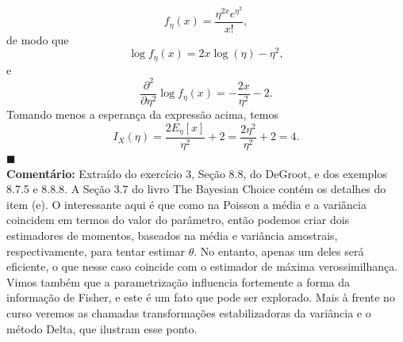 {\begin{equation*}
    f_\eta(x) = \frac{\eta^{2x}e^{\eta^2}}{x!},
\end{equation*}
de modo que
\begin{equation*}
   \log f_\eta(x) = 2x \log(\eta) -\eta^2,
\end{equation*}
e 
\begin{equation*}
   \frac{\partial^2}{\partial\eta^2}\log f_\eta(x) = -\frac{2x}{\eta^2}-2.
\end{equation*}
Tomando menos a esperança da expressão acima, temos
\begin{equation*}
    I_X(\eta) = \frac{2E_\eta[x]}{\eta^2} + 2 = \frac{2\eta^2}{\eta^2} + 2 = 4.
\end{equation*}
$\blacksquare$\\
\textbf{Comentário:}
 Extraído do exercício 3, Seção 8.8, do DeGroot, e dos exemplos 8.7.5 e 8.8.8. A Seção 3.7 do livro The Bayesian Choice contém os detalhes do item (e). 
 O interessante aqui é que como na Poisson a média e a variância coincidem em termos do valor do parâmetro, então podemos criar dois estimadores de momentos, baseados na média e variância amostrais, respectivamente, para tentar estimar $\theta$.
 No entanto, apenas um deles será eficiente, o que nesse caso coincide com o estimador de máxima verossimilhança.
 Vimos também que a parametrização influencia fortemente a forma da informação de Fisher, e este é um fato que pode ser explorado. 
 Mais à frente no curso veremos as chamadas transformações estabilizadoras da variância e o método Delta, que ilustram esse ponto.
}